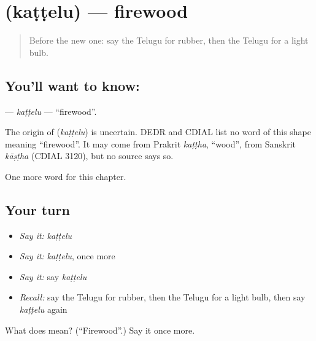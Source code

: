 \section[\texorpdfstring{\te{కట్టెలు} (kaṭṭelu)}{కట్టెలు (kaṭṭelu)}]{ (kaṭṭelu) — firewood}

\label{lesson:TE-C191-kattelu}



\begin{quote}
Before the new one: say the Telugu for rubber, then the Telugu for a light bulb.
\end{quote}

\subsection*{You'll want to know: }
\textbf{} — \emph{kaṭṭelu} — \textquotedblleft{}firewood\textquotedblright{}.

\begin{cousinweb}
The origin of \textbf{} (\emph{kaṭṭelu}) is uncertain. DEDR and CDIAL list no word of this shape meaning \textquotedblleft{}firewood\textquotedblright{}. It may come from Prakrit \emph{kaṭṭha}, \textquotedblleft{}wood\textquotedblright{}, from Sanskrit \emph{kāṣṭha} (CDIAL 3120), but no source says so.
\end{cousinweb}

\begin{grammarlens}[title={What you've built}]
One more word for this chapter.
\end{grammarlens}

\subsection*{Your turn}
\begin{itemize}
\raggedright
  \item \emph{Say it:} \emph{kaṭṭelu}
  \item \emph{Say it:} \emph{kaṭṭelu}, once more
  \item \emph{Say it:} say \emph{kaṭṭelu}
  \item \emph{Recall:} say the Telugu for rubber, then the Telugu for a light bulb, then say \emph{kaṭṭelu} again
\end{itemize}

\begin{tcolorbox}[breakable,colback=teal!4,colframe=teal!35!black,title={Before you move on}]
What does  mean? (\textquotedblleft{}Firewood\textquotedblright{}.) Say it once more.
\end{tcolorbox}
